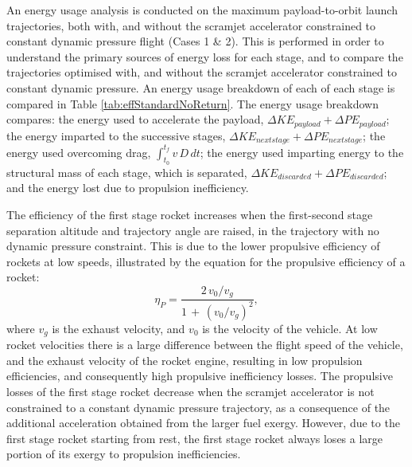 An energy usage analysis is conducted on the maximum payload-to-orbit launch trajectories, both with, and without the scramjet accelerator constrained to constant dynamic pressure flight (Cases 1 \& 2). This is performed in order to understand the primary sources of energy loss for each stage, and to compare the trajectories optimised with, and without the scramjet accelerator constrained to constant dynamic pressure. An energy usage breakdown of each of each stage is compared in Table \ref{tab:effStandardNoReturn}. The energy usage breakdown compares: the energy used to accelerate the payload, $\Delta KE_{payload} + \Delta PE_{payload}$; the energy imparted to the successive stages, $\Delta KE_{next stage} + \Delta PE_{next stage}$; the energy used overcoming drag, $\int_{t_0}^{t_f} v\,D \, dt$; the energy used imparting energy to the structural mass of each stage, which is separated, $\Delta KE_{discarded} + \Delta PE_{discarded}$; and the energy lost due to propulsion inefficiency. 



 The efficiency of the first stage rocket increases when the first-second stage separation altitude and trajectory angle are raised, in the trajectory with no dynamic pressure constraint. 
 This is due to the lower propulsive efficiency of rockets at low speeds, illustrated by the equation for the propulsive efficiency of a rocket\cite{RPE}:
 \begin{equation}\label{eq:rocketeff}
 \eta_P = \frac{2\,v_0/v_g}{1\,+\,(v_0/v_g)^2}, 
 \end{equation}
 where $v_g$ is the exhaust velocity, and $v_0$ is the velocity of the vehicle.
 At low rocket velocities there is a large difference between the flight speed of the vehicle, and the exhaust velocity of the rocket engine, resulting in low propulsion efficiencies, and consequently high propulsive inefficiency losses. 
 The propulsive losses of the first stage rocket decrease when the scramjet accelerator is not constrained to a constant dynamic pressure trajectory, as a consequence of the additional acceleration obtained from the larger fuel exergy. 
 However, due to the first stage rocket starting from rest, the first stage rocket always loses a large portion of its exergy to propulsion inefficiencies.  
 
